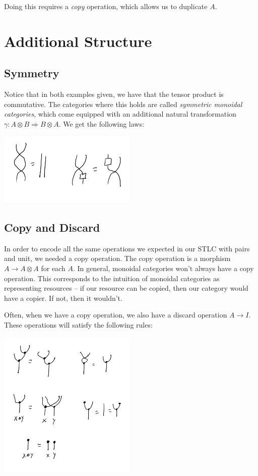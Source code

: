 Doing this requires a \emph{copy} operation, which allows us to duplicate \(A\).


\section{Additional Structure}

\subsection{Symmetry}

Notice that in both examples given, we have that the tensor product is
commutative. The categories where this holds are called \emph{symmetric
monoidal categories}, which come equipped with an additional natural
transformation \(\gamma : A \otimes B \Rightarrow B \otimes A\). We get
the following laws: 

\begin{center}
  \includegraphics[width=250px]{fig/monoidal-categories-sym.png}
\end{center}


\subsection{Copy and Discard}

In order to encode all the same operations we expected in our STLC
with pairs and unit, we needed a copy operation. The copy operation
is a morphism $A \to A \otimes A$ for each $A$.
In general, monoidal categories won't always have a copy operation. This
corresponds to the intuition of monoidal categories as representing
resources -- if our resource can be copied, then our category would have
a copier. If not, then it wouldn't.

Often, when we have a copy operation, we also have a discard operation 
$A \to I$. These operations will satisfy the following rules: 

\begin{center}
  \includegraphics[width=250px]{fig/monoidal-categories-cd.png}
\end{center}


